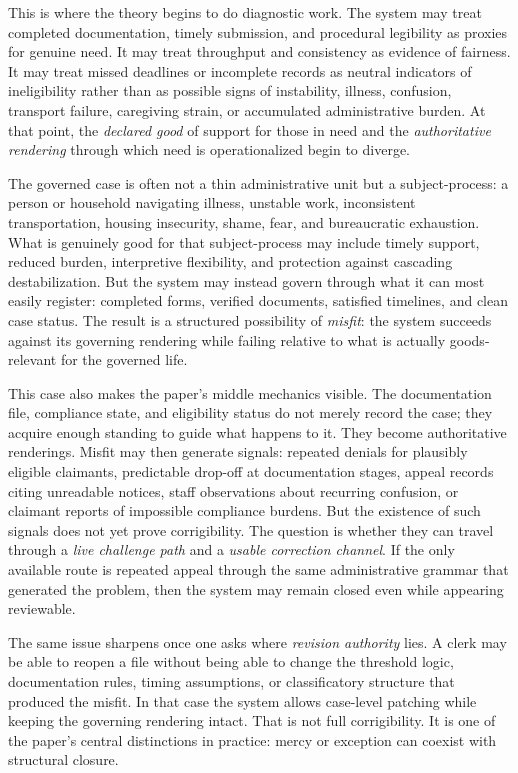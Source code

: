 \documentclass[11pt]{article}
\renewcommand{\emph}[1]{\textit{#1}}
\begin{document}
This is where the theory begins to do diagnostic work. The system may treat completed documentation, timely submission, and procedural legibility as proxies for genuine need. It may treat throughput and consistency as evidence of fairness. It may treat missed deadlines or incomplete records as neutral indicators of ineligibility rather than as possible signs of instability, illness, confusion, transport failure, caregiving strain, or accumulated administrative burden. At that point, the \emph{declared good} of support for those in need and the \emph{authoritative rendering} through which need is operationalized begin to diverge.

The governed case is often not a thin administrative unit but a subject-process: a person or household navigating illness, unstable work, inconsistent transportation, housing insecurity, shame, fear, and bureaucratic exhaustion. What is genuinely good for that subject-process may include timely support, reduced burden, interpretive flexibility, and protection against cascading destabilization. But the system may instead govern through what it can most easily register: completed forms, verified documents, satisfied timelines, and clean case status. The result is a structured possibility of \emph{misfit}: the system succeeds against its governing rendering while failing relative to what is actually goods-relevant for the governed life.

This case also makes the paper's middle mechanics visible. The documentation file, compliance state, and eligibility status do not merely record the case; they acquire enough standing to guide what happens to it. They become authoritative renderings. Misfit may then generate signals: repeated denials for plausibly eligible claimants, predictable drop-off at documentation stages, appeal records citing unreadable notices, staff observations about recurring confusion, or claimant reports of impossible compliance burdens. But the existence of such signals does not yet prove corrigibility. The question is whether they can travel through a \emph{live challenge path} and a \emph{usable correction channel}. If the only available route is repeated appeal through the same administrative grammar that generated the problem, then the system may remain closed even while appearing reviewable.

The same issue sharpens once one asks where \emph{revision authority} lies. A clerk may be able to reopen a file without being able to change the threshold logic, documentation rules, timing assumptions, or classificatory structure that produced the misfit. In that case the system allows case-level patching while keeping the governing rendering intact. That is not full corrigibility. It is one of the paper's central distinctions in practice: mercy or exception can coexist with structural closure.
\end{document}
